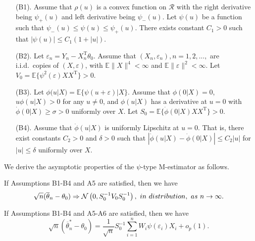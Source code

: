 \documentclass[twoside,11pt]{article}
\def\trans{^{ \mathrm{\scriptscriptstyle T} }}
\def\ol{\overline}
\begin{document}
\begin{enumerate}
	\item[(B1).] Assume that $\rho(u)$ is a convex function on $\mathcal{R}$ with the right derivative being $\psi_+(u)$ and left derivative being $\psi_-(u)$. Let $\psi(u)$ be a function such that $\psi_-(u)\leq \psi(u) \leq \psi_+(u)$. There exists constant $C_1>0$ such that $|\psi(u)|\leq C_1(1+|u|)$.

	\item[(B2).] Let $\varepsilon_n=Y_n-X_n\trans\theta_0$. Assume that $(X_n,\varepsilon_n), n=1,2,...,$  are i.i.d.~copies of
	$(X,\varepsilon)$, with $\mathbb{E}\|X\|^4<\infty$ and $\mathbb{E}\|\varepsilon\|^2<\infty$. Let $V_0=\mathbb{E}\{\psi^2(\varepsilon)XX\trans\}>0$.

	\item[(B3).] Let $\phi(u|X)=\mathbb{E}\{\psi(u+\varepsilon)|X\}$. Assume that $\phi(0|X)=0$, $u\phi(u|X)>0$ for any $u\neq 0$, and $\phi(u|X)$ has a derivative at $u=0$ with $\dot{\phi}(0|X)\geq\sigma>0$ uniformly over $X$. Let $S_0=\mathbb{E}\{\dot{\phi}(0|X)XX\trans\}>0$.

	\item[(B4).] Assume that $\dot{\phi}(u|X)$ is uniformly Lipschitz at $u=0$. That is, there exist constants $C_2>0$ and $\delta>0$ such that $\left|\dot{\phi}(u|X)-\dot{\phi}(0|X)\right|\leq C_2|u|$ for $|u|\leq \delta$ uniformly over $X$.

\end{enumerate}


We derive the asymptotic properties of the $\psi$-type M-estimator as follows.

\begin{lemma}
	\label{normality-set2}
	If Assumptions B1-B4 and A5 are satisfied, then we have
	\begin{eqnarray}
	\sqrt{n}(\ol{\theta}_n-\theta_0) \Rightarrow \mathcal{N}\left(0, S_0^{-1}V_0S_0^{-1}\right), {\mbox \ in \ distribution,\ as\ } n \rightarrow \infty.
	\end{eqnarray}
\end{lemma}


\begin{theorem}
	\label{eq-th3}
	If Assumptions B1-B4 and A5-A6 are satisfied, then we have
	\begin{equation}
	\sqrt{n}(\ol{\theta}_n^*-\theta_0)=\frac{1}{\sqrt{n}}S_0^{-1}\sum_{i=1}^n W_i \psi(\varepsilon_i)X_i+o_p(1).
	\end{equation}
\end{theorem}
\end{document}

